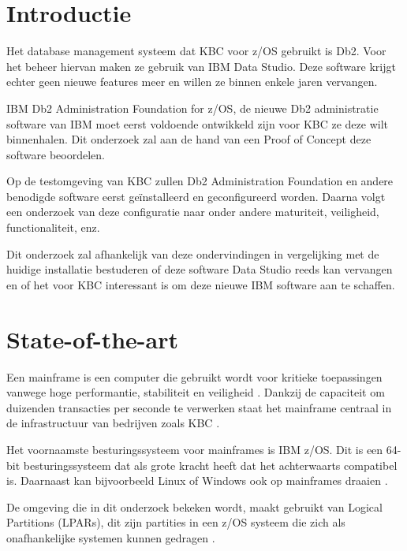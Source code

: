 
\section{Introductie}%
\label{sec:introductie}

Het database management systeem dat KBC voor z/OS gebruikt is Db2. Voor het beheer hiervan maken ze gebruik van IBM Data Studio. Deze software krijgt echter geen nieuwe features meer en willen ze binnen enkele jaren vervangen.

IBM Db2 Administration Foundation for z/OS, de nieuwe Db2 administratie software van IBM moet eerst voldoende ontwikkeld zijn voor KBC ze deze wilt binnenhalen. Dit onderzoek zal aan de hand van een Proof of Concept deze software beoordelen.

Op de testomgeving van KBC zullen Db2 Administration Foundation en andere benodigde software eerst geïnstalleerd en geconfigureerd worden. Daarna volgt een onderzoek van deze configuratie naar onder andere maturiteit, veiligheid, functionaliteit, enz. 

Dit onderzoek zal afhankelijk van deze ondervindingen in vergelijking met de huidige installatie bestuderen of deze software Data Studio reeds kan vervangen en of het voor KBC interessant is om deze nieuwe IBM software aan te schaffen.



\section{State-of-the-art}%
\label{sec:state-of-the-art}

Een mainframe is een computer die gebruikt wordt voor kritieke toepassingen vanwege hoge performantie, stabiliteit en veiligheid \autocite{IBM}. Dankzij de capaciteit om duizenden transacties per seconde te verwerken staat het mainframe centraal in de infrastructuur van bedrijven zoals KBC \autocite{IBM2010}.

Het voornaamste besturingssysteem voor mainframes is IBM z/OS. Dit is een 64-bit besturingssysteem dat als grote kracht heeft dat het achterwaarts compatibel is. Daarnaast kan bijvoorbeeld Linux of Windows ook op mainframes draaien \autocite{MaryE.Shacklett2022}.

De omgeving die in dit onderzoek bekeken wordt, maakt gebruikt van Logical Partitions (LPARs), dit zijn partities in een z/OS systeem die zich als onafhankelijke systemen kunnen gedragen \autocite{IBM2010a}.

